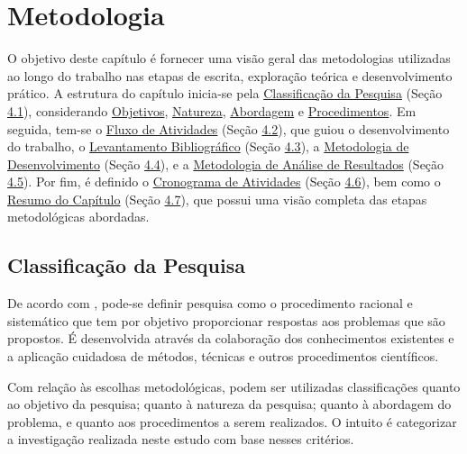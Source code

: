 \chapter[Metodologia]{Metodologia}
\label{chap:Metodologia}

O objetivo deste capítulo é fornecer uma visão geral das metodologias utilizadas ao longo do trabalho nas etapas de escrita, exploração teórica e desenvolvimento prático. A estrutura do capítulo inicia-se pela \hyperref[sec:Classificacao da Pesquisa]{Classificação da Pesquisa} 
(Seção \hyperref[sec:Classificacao da Pesquisa]{4.1}), considerando \hyperref[sec:Objetivos2]{Objetivos}, \hyperref[sec:Natureza]{Natureza}, \hyperref[sec:Abordagem]{Abordagem} e \hyperref[sec:Procedimentos]{Procedimentos}. 
Em seguida, tem-se o \hyperref[sec:Fluxo de Atividades]{Fluxo de Atividades} (Seção \hyperref[sec:Fluxo de Atividades]{4.2}), que guiou o desenvolvimento do trabalho, o \hyperref[sec:Levantamento Bibliografico]{Levantamento Bibliográfico} (Seção \hyperref[sec:Levantamento Bibliografico]{4.3}), 
a \hyperref[sec:Metodologia de Desenvolvimento]{Metodologia de Desenvolvimento} (Seção \hyperref[sec:Metodologia de Desenvolvimento]{4.4}), e a \hyperref[sec:Metodologia de Analise de Resultados]{Metodologia de Análise de Resultados} (Seção \hyperref[sec:Metodologia de Analise de Resultados]{4.5}). 
Por fim, é definido o \hyperref[sec:Cronograma]{Cronograma de Atividades} (Seção \hyperref[sec:Cronograma]{4.6}), bem como o \hyperref[sec:Resumo do Capitulo]{Resumo do Capítulo} (Seção \hyperref[sec:Resumo do Capitulo]{4.7}), que possui uma visão completa das etapas metodológicas abordadas.

\section{Classificação da Pesquisa}
\label{sec:Classificacao da Pesquisa}
De acordo com , pode-se definir pesquisa como o procedimento racional e sistemático que tem por objetivo proporcionar respostas aos problemas que são propostos. É desenvolvida através da colaboração 
dos conhecimentos existentes e a aplicação cuidadosa de métodos, técnicas e outros procedimentos científicos.

Com relação às escolhas metodológicas, podem ser utilizadas classificações quanto ao objetivo da pesquisa; quanto à natureza da pesquisa; quanto à abordagem do problema, e quanto aos procedimentos a serem realizados. O intuito é 
categorizar a investigação realizada neste estudo com base nesses critérios.

